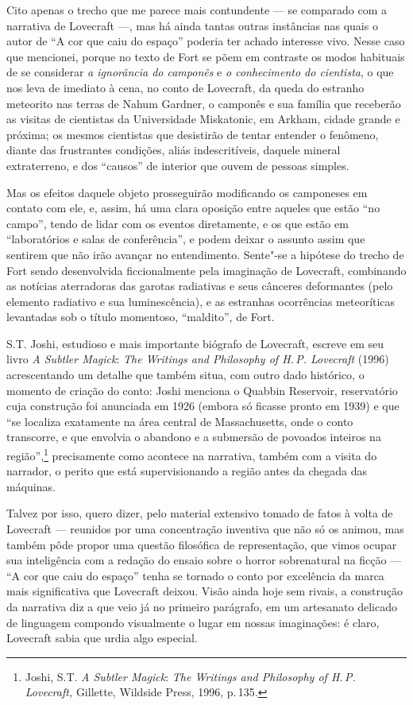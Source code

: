 Cito apenas o trecho que me parece mais contundente --- se comparado com
a narrativa de Lovecraft ---, mas há ainda tantas outras instâncias nas
quais o autor de ``A cor que caiu do espaço'' poderia ter achado
interesse vivo. Nesse caso que mencionei, porque no texto de Fort se
põem em contraste os modos habituais de se considerar \emph{a ignorância
do camponês} e \emph{o conhecimento do cientista}, o que nos leva de
imediato à cena, no conto de Lovecraft, da queda do estranho meteorito
nas terras de Nahum Gardner, o camponês e sua família que receberão as
visitas de cientistas da Universidade Miskatonic, em Arkham, cidade
grande e próxima; os mesmos cientistas que desistirão de tentar entender
o fenômeno, diante das frustrantes condições, aliás indescritíveis,
daquele mineral extraterreno, e dos ``causos'' de interior que ouvem de
pessoas simples.

Mas os efeitos daquele objeto prosseguirão modificando os camponeses em
contato com ele, e, assim, há uma clara oposição entre aqueles que estão
``no campo'', tendo de lidar com os eventos diretamente, e os que estão
em ``laboratórios e salas de conferência'', e podem deixar o assunto
assim que sentirem que não irão avançar no entendimento. Sente"-se a
hipótese do trecho de Fort sendo desenvolvida ficcionalmente pela
imaginação de Lovecraft, combinando as notícias aterradoras das garotas
radiativas e seus cânceres deformantes (pelo elemento radiativo e sua
luminescência), e as estranhas ocorrências meteoríticas levantadas sob o
título momentoso, ``maldito'', de Fort.

S.T. Joshi, estudioso e mais importante biógrafo de Lovecraft, escreve
em seu livro \emph{A Subtler Magick}: \emph{The Writings and Philosophy of H.\,P. Lovecraft} (1996)
acrescentando um detalhe que também situa, com outro dado histórico, o
momento de criação do conto: Joshi menciona o Quabbin Reservoir,
reservatório cuja construção foi anunciada em 1926 (embora só ficasse
pronto em 1939) e que ``se localiza exatamente na área central de
Massachusetts, onde o conto transcorre, e que envolvia o abandono e a
submersão de povoados inteiros na região'',\footnote{Joshi, S.T. \emph{A
  Subtler Magick}: \emph{The Writings and Philosophy of H.\,P. Lovecraft,}
  Gillette, Wildside Press, 1996, p.\,135.} precisamente como acontece na
narrativa, também com a visita do narrador, o perito que está
supervisionando a região antes da chegada das máquinas.

Talvez por isso, quero dizer, pelo material extensivo tomado de fatos à
volta de Lovecraft --- reunidos por uma concentração inventiva que não
só os animou, mas também pôde propor uma questão filosófica de
representação, que vimos ocupar sua inteligência com a redação do ensaio
sobre o horror sobrenatural na ficção --- ``A cor que caiu do espaço''
tenha se tornado o conto por excelência da marca mais significativa que
Lovecraft deixou. Visão ainda hoje sem rivais, a construção da narrativa
diz a que veio já no primeiro parágrafo, em um artesanato delicado de
linguagem compondo visualmente o lugar em nossas imaginações: é claro,
Lovecraft sabia que urdia algo especial.

